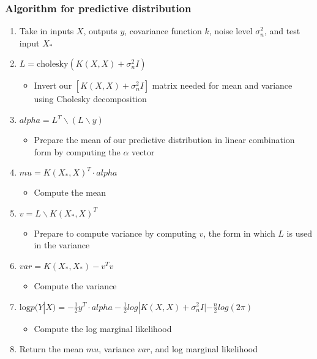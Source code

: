 \documentclass[10pt]{article}
\begin{document}
\subsubsection{Algorithm for predictive distribution}
\begin{enumerate}
    \item Take in inputs $X$, outputs $y$, covariance function $k$, noise level $\sigma^2_n$, and test input $X_*$
    \item $L = \text{cholesky}(K(X,X) + \sigma_n^2I)$
    \begin{itemize}
        \item Invert our $[K(X,X) + \sigma^2_nI]$ matrix needed for mean and variance using Cholesky decomposition
    \end{itemize}
    \item $alpha = L^T \backslash (L \backslash y)$
    \begin{itemize}
        \item Prepare the mean of our predictive distribution in linear combination form by computing the $\alpha$ vector
    \end{itemize}
    \item $mu = K(X_*, X)^T \cdot alpha$
    \begin{itemize}
        \item Compute the mean
    \end{itemize}
    \item $v = L \backslash K(X_*, X)^T$
    \begin{itemize}
        \item Prepare to compute variance by computing $v$, the form in which $L$ is used in the variance
    \end{itemize}
    \item $var = K(X_*, X_*) - v^T v$
    \begin{itemize}
        \item Compute the variance
    \end{itemize}
    \item $\text{log} p(Y|X) = -\frac{1}{2}y^T \cdot alpha - \frac{1}{2}log|K(X,X) + \sigma^2_nI| - \frac{n}{2}log(2\pi)$
    \begin{itemize}
        \item Compute the log marginal likelihood 
    \end{itemize}
    \item Return the mean $mu$, variance $var$, and log marginal likelihood
\end{enumerate}
\end{document}
